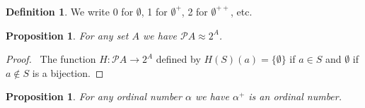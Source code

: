 \documentclass{book}
\let\qed\relax
\newtheorem{prop}[ax]{Proposition}
\theoremstyle{definition}
\newtheorem{df}[ax]{Definition}
\begin{document}
\begin{df}
We write 0 for $\emptyset$, 1 for $\emptyset^+$, 2 for $\emptyset^{++}$, etc.
\end{df}

\begin{prop}
For any set $A$ we have $\mathcal{P} A \approx 2^A$.
\end{prop}

\begin{proof}
\pf\ The function $H : \mathcal{P} A \rightarrow 2^A$ defined by $H(S)(a) = \{\emptyset\}$ if $a \in S$ and $\emptyset$ if $a \notin S$ is a bijection. \qed
\end{proof}

\begin{prop}
For any ordinal number $\alpha$ we have $\alpha^+$ is an ordinal number.
\end{prop}
\end{document}
